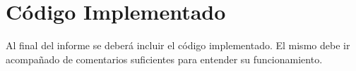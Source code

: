 \documentclass[10pt]{article}
\begin{document}
\pagebreak

\appendix
\section{Código Implementado}
Al final del informe se deberá incluir el código implementado. El mismo debe ir acompañado de comentarios suficientes para entender su funcionamiento.



\end{document}
